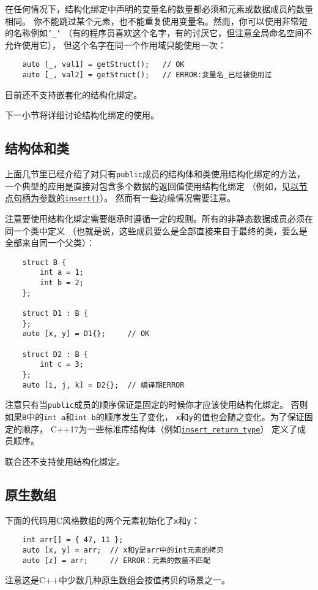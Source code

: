 在任何情况下，结构化绑定中声明的变量名的数量都必须和元素或数据成员的数量相同。
你不能跳过某个元素，也不能重复使用变量名。然而，你可以使用非常短的名称例如\texttt{'\_'}
（有的程序员喜欢这个名字，有的讨厌它，但注意全局命名空间不允许使用它），
但这个名字在同一个作用域只能使用一次：
\begin{lstlisting}
    auto [_, val1] = getStruct();   // OK
    auto [_, val2] = getStruct();   // ERROR:变量名_已经被使用过
\end{lstlisting}
目前还不支持嵌套化的结构化绑定。

下一小节将详细讨论结构化绑定的使用。

\subsection{结构体和类}
上面几节里已经介绍了对只有\texttt{public}成员的结构体和类使用结构化绑定的方法，
一个典型的应用是直接对包含多个数据的返回值使用结构化绑定
（例如，见\hyperref[insert节点句柄]{以节点句柄为参数的\texttt{insert()}}）。
然而有一些边缘情况需要注意。

注意要使用结构化绑定需要继承时遵循一定的规则。所有的非静态数据成员必须在同一个类中定义
（也就是说，这些成员要么是全部直接来自于最终的类，要么是全部来自同一个父类）：
\begin{lstlisting}
    struct B {
        int a = 1;
        int b = 2;
    };

    struct D1 : B {
    };
    auto [x, y] = D1{};     // OK

    struct D2 : B {
        int c = 3;
    };
    auto [i, j, k] = D2{};  // 编译期ERROR
\end{lstlisting}
注意只有当\texttt{public}成员的顺序保证是固定的时候你才应该使用结构化绑定。
否则如果\texttt{B}中的\texttt{int a}和\texttt{int b}的顺序发生了变化，
\texttt{x}和\texttt{y}的值也会随之变化。为了保证固定的顺序，
C++17为一些标准库结构体（例如\hyperref[insert节点句柄]{\texttt{insert\_return\_type}}）
定义了成员顺序。

联合还不支持使用结构化绑定。

\subsection{原生数组}
下面的代码用C风格数组的两个元素初始化了\texttt{x}和\texttt{y}：
\begin{lstlisting}
    int arr[] = { 47, 11 };
    auto [x, y] = arr;  // x和y是arr中的int元素的拷贝
    auto [z] = arr;     // ERROR：元素的数量不匹配
\end{lstlisting}
注意这是C++中少数几种原生数组会按值拷贝的场景之一。

